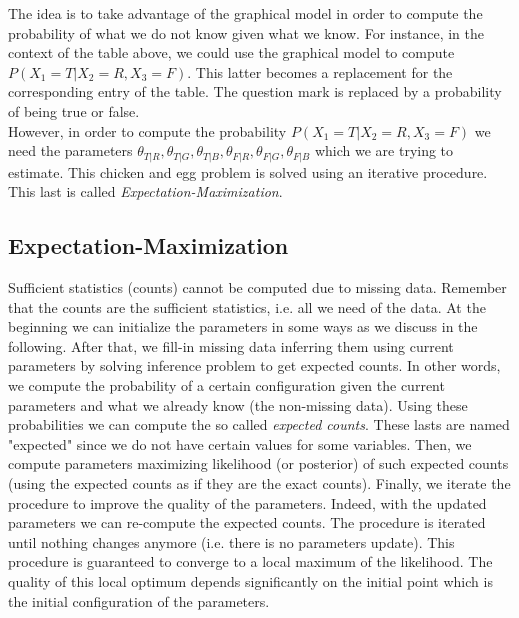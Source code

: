 The idea is to take advantage of the graphical model in order to compute the
probability of what we do not know given what we know. For instance, in the
context of the table above, we could use the graphical model to compute $P(X_{1}=
T | X_{2}=R, X_{3}=F)$. This latter becomes a replacement for the corresponding
entry of the table. The question mark is replaced by a probability of being true
or false. \\ However, in order to compute the probability $P(X_{1}=T | X_{2}=R, X
_{3}=F)$ we need the parameters $\theta_{T|R}, \theta_{T|G}, \theta_{T|B},\theta_{F|R}
, \theta_{F|G}, \theta_{F|B}$ which we are trying to estimate. This chicken and
egg problem is solved using an iterative procedure. This last is called \textit{Expectation-Maximization}.

\subsection{Expectation-Maximization}
Sufficient statistics (counts) cannot be computed due to missing data. Remember that
the counts are the sufficient statistics, i.e. all we need of the data. At the
beginning we can initialize the parameters in some ways as we discuss in the
following. After that, we fill-in missing data inferring them using current
parameters by solving inference problem to get expected counts. In other words,
we compute the probability of a certain configuration given the current
parameters and what we already know (the non-missing data). Using these probabilities
we can compute the so called \textit{expected counts}. These lasts are named "expected"
since we do not have certain values for some variables. Then, we compute parameters
maximizing likelihood (or posterior) of such expected counts (using the expected
counts as if they are the exact counts). Finally, we iterate the procedure to improve
the quality of the parameters. Indeed, with the updated parameters we can re-compute
the expected counts. The procedure is iterated until nothing changes anymore (i.e.
there is no parameters update). This procedure is guaranteed to converge to a
local maximum of the likelihood. The quality of this local optimum depends significantly
on the initial point which is the initial configuration of the parameters.

